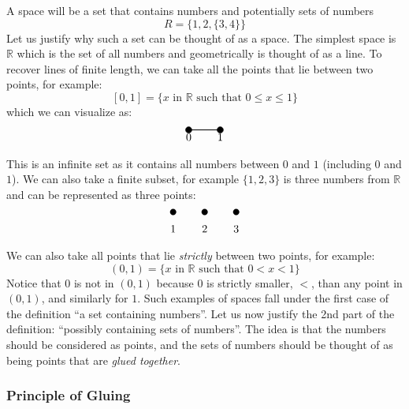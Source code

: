 \documentclass{article}
\newcommand{\R}{{\mathbb{R}}}
\begin{document}
A space will be a set that contains numbers and potentially sets of numbers
\[
  R = \{1,2,\{3,4\}\}
\]
Let us justify why such a set can be thought of as a space. The simplest space is $\R$ which is the set of all
numbers and geometrically is thought of as a line. To recover lines of finite length, we can take all the
points that lie between two points, for example:
\[
  [0,1] = \{\text{$x$ in $\R$ such that $0\le x \le 1$}\}
\]
which we can visualize as:
\[
\begin{tikzpicture}
  \draw[thick] (0,0) -- (1,0);
  \draw[black, fill=black] (0,0) circle (0.1) node[below] {0};
  \draw[black, fill=black] (1,0) circle (0.1) node[below] {1};
\end{tikzpicture}
\]
This is an infinite set as it contains all numbers between $0$ and $1$ (including $0$ and $1$). We can also
take a finite subset, for example $\{1,2,3\}$ is three numbers from $\R$ and can be represented as three points:
\[
\begin{tikzpicture}
  \foreach \x in {1,2,3} {
    \fill[black] (\x,0) circle (0.1);
    \node[below] at (\x,-0.3) {\x};
  }
\end{tikzpicture}
\]
We can also take all points that lie \emph{strictly} between two points, for example:
\[
  (0,1) = \{\text{$x$ in $\R$ such that $0< x < 1$}\}
\]
Notice that $0$ is not in $(0,1)$ because $0$ is strictly smaller, $<$, than any point in $(0,1)$, and
similarly for $1$. Such examples of spaces fall under the first case of the definition ``a set
containing numbers''. Let us now justify the 2nd part of the definition: ``possibly containing sets of
numbers''. The idea is that the numbers should be considered as points, and the sets of numbers should be
thought of as being points that are \emph{glued together}.

\subsubsection*{Principle of Gluing}
\end{document}
